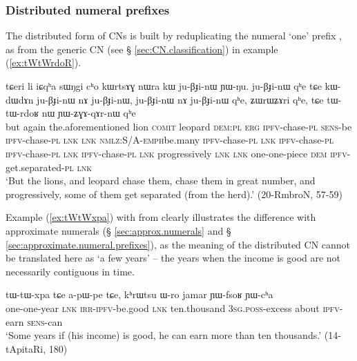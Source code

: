 \subsubsection{Distributed numeral prefixes} \label{sec:numeral.prefixes.distributed}
The distributed form of CNs is built by reduplicating the numeral `one' prefix , as  from the generic CN  (see § \ref{sec:CN.classification}) in example (\ref{ex:tWtWrdoR}).

\begin{exe}
\ex  \label{ex:tWtWrdoR}
\gll 
tɕeri li iɕqʰa sɯŋgi cʰo kɯrtsɤɣ nɯra kɯ ju-βɟi-nɯ ɲɯ-ŋu. ju-βɟi-nɯ qʰe tɕe kɯ-dɯ\redp{}dɤn ju-βɟi-nɯ nɤ ju-βɟi-nɯ, ju-βɟi-nɯ nɤ ju-βɟi-nɯ qʰe, ʑɯrɯʑɤri qʰe, tɕe tɯ-tɯ-rdoʁ nɯ ɲɯ-ʑɣɤ-qɤr-nɯ qʰe \\
but again the.aforementioned  lion \textsc{comit} leopard \textsc{dem}:\textsc{pl} \textsc{erg} \textsc{ipfv}-chase-\textsc{pl} \textsc{sens}-be \textsc{ipfv}-chase-\textsc{pl} \textsc{lnk} \textsc{lnk} \textsc{nmlz}:S/A-\textsc{emph}\redp{}be.many \textsc{ipfv}-chase-\textsc{pl} \textsc{lnk} \textsc{ipfv}-chase-\textsc{pl}  \textsc{ipfv}-chase-\textsc{pl} \textsc{lnk} \textsc{ipfv}-chase-\textsc{pl} \textsc{lnk} progressively \textsc{lnk} \textsc{lnk} one-one-piece \textsc{dem} \textsc{ipfv}-get.separated-\textsc{pl} \textsc{lnk} \\
\glt `But the lions, and leopard chase them, chase them in great number, and progressively, some of them get separated (from the herd).' (20-RmbroN, 57-59)
\end{exe}

 Example (\ref{ex:tWtWxpa}) with  from  clearly illustrates the difference with approximate numerals (§ \ref{sec:approx.numerals} and § \ref{sec:approximate.numeral.prefixes}), as the meaning of the distributed CN cannot be translated here as `a few years' -- the years when the income is good are not necessarily contiguous in time.

\begin{exe}
\ex  \label{ex:tWtWxpa}
\gll   tɯ-tɯ-xpa tɕe a-pɯ-pe tɕe, kʰrɯtsu ɯ-ro jamar ɲɯ-fsoʁ ɲɯ-cʰa \\
one-one-year  \textsc{lnk} \textsc{irr}-\textsc{ipfv}-be.good \textsc{lnk} ten.thousand \textsc{3sg}.\textsc{poss}-excess about \textsc{ipfv}-earn \textsc{sens}-can \\ 
\glt `Some years if (his income) is good, he can earn more than ten thousands.' (14-tApitaRi, 180)
\end{exe}

